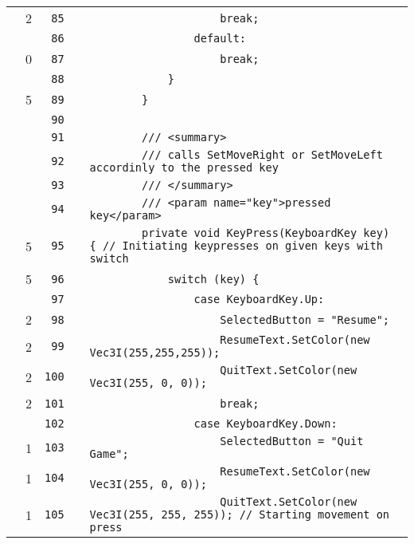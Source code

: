 \documentclass[a4paper,landscape,10pt]{article}
\begin{document}
\begin{longtable}[l]{lrrll}
\cellcolor{green} & 2 & \verb~85~ & & \verb~                    break;~\\
\cellcolor{gray} &  & \verb~86~ & & \verb~                default:~\\
\cellcolor{red} & 0 & \verb~87~ & & \verb~                    break;~\\
\cellcolor{gray} &  & \verb~88~ & & \verb~            }~\\
\cellcolor{green} & 5 & \verb~89~ & & \verb~        }~\\
\cellcolor{gray} &  & \verb~90~ & & \verb~~\\
\cellcolor{gray} &  & \verb~91~ & & \verb~        /// <summary>~\\
\cellcolor{gray} &  & \verb~92~ & & \verb~        /// calls SetMoveRight or SetMoveLeft accordinly to the pressed key~\\
\cellcolor{gray} &  & \verb~93~ & & \verb~        /// </summary>~\\
\cellcolor{gray} &  & \verb~94~ & & \verb~        /// <param name="key">pressed key</param>~\\
\cellcolor{green} & 5 & \verb~95~ & & \verb~        private void KeyPress(KeyboardKey key) { // Initiating keypresses on given keys with switch~\\
\cellcolor{green} & 5 & \verb~96~ & & \verb~            switch (key) {~\\
\cellcolor{gray} &  & \verb~97~ & & \verb~                case KeyboardKey.Up:~\\
\cellcolor{green} & 2 & \verb~98~ & & \verb~                    SelectedButton = "Resume";~\\
\cellcolor{green} & 2 & \verb~99~ & & \verb~                    ResumeText.SetColor(new Vec3I(255,255,255));~\\
\cellcolor{green} & 2 & \verb~100~ & & \verb~                    QuitText.SetColor(new Vec3I(255, 0, 0));~\\
\cellcolor{green} & 2 & \verb~101~ & & \verb~                    break;~\\
\cellcolor{gray} &  & \verb~102~ & & \verb~                case KeyboardKey.Down:~\\
\cellcolor{green} & 1 & \verb~103~ & & \verb~                    SelectedButton = "Quit Game";~\\
\cellcolor{green} & 1 & \verb~104~ & & \verb~                    ResumeText.SetColor(new Vec3I(255, 0, 0));~\\
\cellcolor{green} & 1 & \verb~105~ & & \verb~                    QuitText.SetColor(new Vec3I(255, 255, 255)); // Starting movement on press~\\

\end{longtable}
\end{document}
